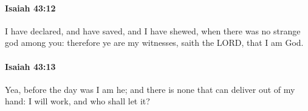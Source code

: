 		\paragraph{Isaiah 43:12} %
			\label{ISAIAH-43-12}

			I have declared, and have saved, and I have shewed, when there was no strange god among you: therefore ye are my witnesses, saith the LORD, that I am God.


		\paragraph{Isaiah 43:13} %
			\label{ISAIAH-43-13}

			Yea, before the day was I am he; and there is none that can deliver out of my hand: I will work, and who shall let it?


